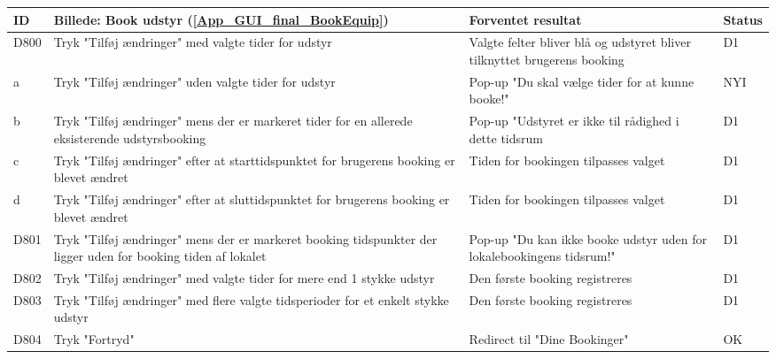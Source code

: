 \begin{tabular}{ |p{0.85cm}| p{5.5cm} | p{8.65cm} | p{1cm} | }
\hline
\textbf{ID} & \textbf{Billede: Book udstyr (\ref{App_GUI_final_BookEquip})}  & \textbf{Forventet resultat} & \textbf{Status}\\ 
\hline
D800 & Tryk "Tilføj ændringer" med valgte tider for udstyr & Valgte felter bliver blå og udstyret bliver tilknyttet brugerens booking & D1 \\
\hline
a & Tryk "Tilføj ændringer" uden valgte tider for udstyr & Pop-up "Du skal vælge tider for at kunne booke!" & NYI \\
\hline
b & Tryk "Tilføj ændringer" mens der er markeret tider for en allerede eksisterende udstyrsbooking & Pop-up "Udstyret er ikke til rådighed i dette tidsrum & D1 \\
\hline
c & Tryk "Tilføj ændringer" efter at starttidspunktet for brugerens booking er blevet ændret & Tiden for bookingen tilpasses valget & D1 \\
\hline
d & Tryk "Tilføj ændringer" efter at sluttidspunktet for brugerens booking er blevet ændret & Tiden for bookingen tilpasses valget & D1 \\
\hline
D801 & Tryk "Tilføj ændringer" mens der er markeret booking tidspunkter der ligger uden for booking tiden af lokalet & Pop-up "Du kan ikke booke udstyr uden for lokalebookingens tidsrum!" & D1 \\
\hline
D802 & Tryk "Tilføj ændringer" med valgte tider for mere end 1 stykke udstyr & Den første booking registreres & D1 \\
\hline
D803 & Tryk "Tilføj ændringer" med flere valgte tidsperioder for et enkelt stykke udstyr &  Den første booking registreres & D1\\
\hline
D804 & Tryk "Fortryd" & Redirect til "Dine Bookinger" & OK \\
\hline
\end{tabular}

